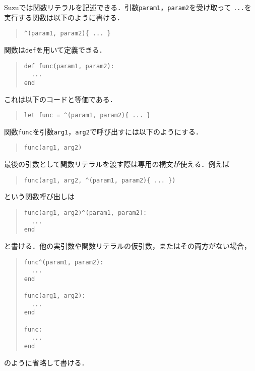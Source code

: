 \documentclass[a4paper,11pt,dvipdfmx]{jreport}
\begin{document}
Suzuでは関数リテラルを記述できる．引数\verb|param1|，\verb|param2|を受け取って
\verb|...|を実行する関数は以下のように書ける．
\begin{quote}
\begin{verbatim}
^(param1, param2){ ... }
\end{verbatim}
\end{quote}

関数は\verb|def|を用いて定義できる．
\begin{quote}
\begin{verbatim}
def func(param1, param2):
  ...
end
\end{verbatim}
\end{quote}
これは以下のコードと等価である．
\begin{quote}
\begin{verbatim}
let func = ^(param1, param2){ ... }
\end{verbatim}
\end{quote}

関数\verb|func|を引数\verb|arg1|，\verb|arg2|で呼び出すには以下のようにする．
\begin{quote}
\begin{verbatim}
func(arg1, arg2)
\end{verbatim}
\end{quote}

最後の引数として関数リテラルを渡す際は専用の構文が使える．例えば
\begin{quote}
\begin{verbatim}
func(arg1, arg2, ^(param1, param2){ ... })
\end{verbatim}
\end{quote}
という関数呼び出しは
\begin{quote}
\begin{verbatim}
func(arg1, arg2)^(param1, param2):
  ...
end
\end{verbatim}
\end{quote}
と書ける．他の実引数や関数リテラルの仮引数，またはその両方がない場合，
\begin{quote}
\begin{verbatim}
func^(param1, param2):
  ...
end

func(arg1, arg2):
  ...
end

func:
  ...
end
\end{verbatim}
\end{quote}
のように省略して書ける．
\end{document}
